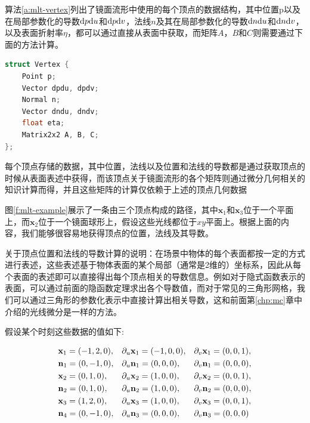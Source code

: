 算法\ref{a:mlt-vertex}列出了镜面流形中使用的每个顶点的数据结构，其中位置p以及在局部参数化的导数${\rm d}p{\rm d}u$和${\rm d}p{\rm d}v$，法线$n$及其在局部参数化的导数${\rm d}n{\rm d}u$和${\rm d}n{\rm d}v$，以及表面折射率$\eta$，都可以通过直接从表面中获取，而矩阵$A$，$B$和$C$则需要通过下面的方法计算。

\begin{algorithm}
\begin{lstlisting}[language=C++, mathescape]
struct Vertex { 
	Point p;
	Vector dpdu, dpdv; 
	Normal n;
	Vector dndu, dndv; 
	float eta; 
	Matrix2x2 A, B, C;
};
\end{lstlisting}
\caption{每个顶点存储的数据，其中位置，法线以及位置和法线的导数都是通过获取顶点的时候从表面表述中获得，而该顶点关于镜面流形的各个矩阵则通过微分几何相关的知识计算而得，并且这些矩阵的计算仅依赖于上述的顶点几何数据}
\label{a:mlt-vertex}
\end{algorithm}

图\ref{f:mlt-example}展示了一条由三个顶点构成的路径，其中$\mathbf{x}_1$和$\mathbf{x}_3$位于一个平面上，而$\mathbf{x}_2$位于一个镜面球形上，假设这些光线都位于$xy$平面上。根据上面的内容，我们能够很容易地获得顶点的位置，法线及其导数。

\begin{myshaded}
	关于顶点位置和法线的导数计算的说明：在场景中物体的每个表面都按一定的方式进行表述，这些表述基于物体表面的某个局部（通常是2维的）坐标系，因此从每个表面的表述即可以直接得出每个顶点相关的导数信息。例如对于隐式函数表示的表面，可以通过前面的隐函数定理求出各个导数值，而对于常见的三角形网格，我们可以通过三角形的参数化表示中直接计算出相关导数，这和前面第\ref{chp:mc}章中介绍的光线微分是一样的方法。
\end{myshaded}

假设某个时刻这些数据的值如下:

\begin{equation}
\begin{aligned}
	&\mathbf{x}_1=(-1,2,0), &&{\rm \partial}_u\mathbf{x}_1=(-1,0,0), &&{\rm \partial}_v\mathbf{x}_1=(0,0,1),\\
	&\mathbf{n}_1=(0,-1,0), &&{\rm \partial}_u\mathbf{n}_1=(0,0,0),  &&{\rm \partial}_v\mathbf{n}_1=(0,0,0),\\
	&\mathbf{x}_2=(0,1,0),  &&{\rm \partial}_u\mathbf{x}_2=(1,0,0),  &&{\rm \partial}_v\mathbf{x}_2=(0,0,1),\\
	&\mathbf{n}_2=(0,1,0),  &&{\rm \partial}_u\mathbf{n}_2=(1,0,0),  &&{\rm \partial}_v\mathbf{n}_2=(0,0,0),\\
	&\mathbf{x}_3=(1,2,0),  &&{\rm \partial}_u\mathbf{x}_3=(1,0,0),  &&{\rm \partial}_v\mathbf{x}_3=(0,0,1),\\
	&\mathbf{n}_4=(0,-1,0), &&{\rm \partial}_u\mathbf{n}_3=(0,0,0),  &&{\rm \partial}_v\mathbf{n}_3=(0,0,0)
\end{aligned}
\end{equation}

